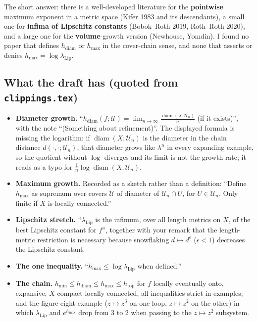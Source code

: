 \documentclass[
]{article}
\newcounter{none} %
\providecommand{\tightlist}{%
  \setlength{\itemsep}{0pt}\setlength{\parskip}{0pt}}
\begin{document}
The short answer: there is a well-developed literature for the
\textbf{pointwise} maximum exponent in a metric space (Kifer 1983 and
its descendants), a small one for \textbf{infima of Lipschitz constants}
(Bobok--Roth 2019, Roth--Roth 2020), and a large one for the
\textbf{volume}-growth version (Newhouse, Yomdin). I found no paper that
defines \(h_{\mathrm{diam}}\) or \(h_{\max}\) in the cover-chain sense,
and none that asserts or denies \(h_{\max}=\log\lambda_{\mathrm{Lip}}\).

\subsection{\texorpdfstring{What the draft has (quoted from
\texttt{clippings.tex})}{What the draft has (quoted from clippings.tex)}}\label{what-the-draft-has-quoted-from-clippings.tex}

\begin{itemize}
\tightlist
\item
  \textbf{Diameter growth.}
  ``\(h_{\mathrm{diam}}(f;\mathcal U)=\lim_{n\to\infty}\frac{\operatorname{diam}(X;\mathcal U_n)}{n}\)
  (if it exists)'', with the note ``(Something about refinement)''. The
  displayed formula is missing the logarithm: if
  \(\operatorname{diam}(X;\mathcal U_n)\) is the diameter in the chain
  distance \(d(\cdot,\cdot;\mathcal U_n)\), that diameter grows like
  \(\lambda^n\) in every expanding example, so the quotient without
  \(\log\) diverges and its limit is not the growth rate; it reads as a
  typo for \(\frac1n\log\operatorname{diam}(X;\mathcal U_n)\).
\item
  \textbf{Maximum growth.} Recorded as a sketch rather than a
  definition: ``Define \(h_{\max}\) as supremum over covers
  \(\mathcal U\) of diameter of \(\mathcal U_n\cap U\), for
  \(U\in\mathcal U_n\). Only finite if \(X\) is locally connected.''
\item
  \textbf{Lipschitz stretch.} ``\(\lambda_{\mathrm{Lip}}\) is the
  infimum, over all length metrics on \(X\), of the best Lipschitz
  constant for \(f\)'', together with your remark that the length-metric
  restriction is necessary because snowflaking \(d\mapsto d^\epsilon\)
  (\(\epsilon<1\)) decreases the Lipschitz constant.
\item
  \textbf{The one inequality.}
  ``\(h_{\max}\le\log\lambda_{\mathrm{Lip}}\) when defined.''
\item
  \textbf{The chain.}
  \(h_{\min}\le h_{\mathrm{diam}}\le h_{\max}\le h_{\mathrm{top}}\) for
  \(f\) locally eventually onto, expansive, \(X\) compact locally
  connected, all inequalities strict in examples; and the figure-eight
  example (\(z\mapsto z^3\) on one loop, \(z\mapsto z^2\) on the other)
  in which \(\lambda_{\mathrm{Lip}}\) and \(e^{h_{\max}}\) drop from
  \(3\) to \(2\) when passing to the \(z\mapsto z^2\) subsystem.
\end{itemize}
\end{document}
